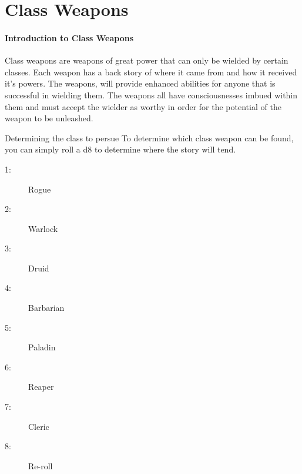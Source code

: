 \chapter{Class Weapons} \label{Weapons}

\subsubsection{Introduction to Class Weapons}

Class weapons are weapons of great power that can only be wielded by certain classes. Each weapon has a back story of where it came from and how it received it's powers. The weapons, will provide enhanced abilities for anyone that is successful in wielding them. The weapons all have consciousnesses imbued within them and must accept the wielder as worthy in order for the potential of the weapon to be unleashed. 

\begin{commentbox}{Determining the class to persue}
	To determine which class weapon can be found, you can simply roll a d8 to determine where the story will tend.
	\hline
	\begin{multicols}{4}
		\begin{description}
			\item[1:] Rogue 
			\item[2:] Warlock
			\item[3:] Druid
			\item[4:] Barbarian
			\item[5:] Paladin
			\item[6:] Reaper
			\item[7:] Cleric
			\item[8:] Re-roll
		\end{description}
	\end{multicols}
\end{commentbox}













